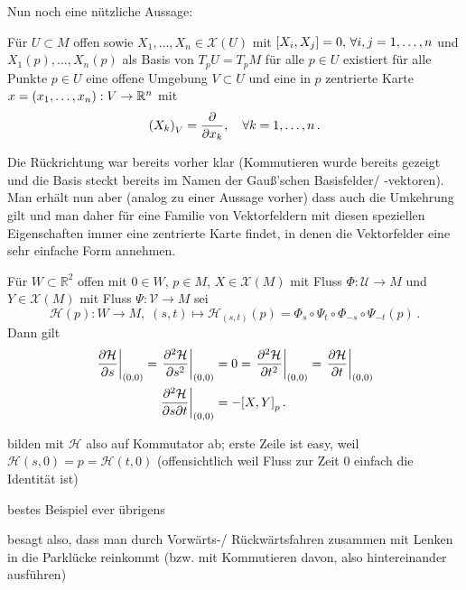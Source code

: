 \documentclass[../H_Analysis_main.tex]{subfiles}
\begin{document}
Nun noch eine nützliche Aussage:
\begin{cor}
Für $U \subset M$ offen sowie $X_1, \dots, X_n \in \mathcal{X}(U)$ mit $\qty[X_i, X_j] = 0, \, \forall i,j = 1, \dots, n$ und $X_1(p), \dots, X_n(p)$ als Basis von $T_p U = T_p M$ für alle $p \in U$ existiert für alle Punkte $p \in U$ eine offene Umgebung $V \subset U$ und eine in $p$ zentrierte Karte $x = \qty(x_1, \dots, x_n): V \rightarrow \mathbb{R}^n$ mit
\begin{equation}
\qty(X_k)_V = \pdv{x_k}, \quad \forall k = 1, \dots, n \, .
\end{equation}
\end{cor}
Die Rückrichtung war bereits vorher klar (Kommutieren wurde bereits gezeigt und die Basis steckt bereits im Namen der Gauß'schen Basisfelder/ -vektoren). Man erhält nun aber (analog zu einer Aussage vorher) dass auch die Umkehrung gilt und man daher für eine Familie von Vektorfeldern mit diesen speziellen Eigenschaften immer eine zentrierte Karte findet, in denen die Vektorfelder eine sehr einfache Form annehmen.

\begin{satz}
Für $W \subset \mathbb{R}^2$ offen mit $0 \in W$, $p \in M$, $X \in \mathcal{X}(M)$ mit Fluss $\Phi: \mathcal{U} \rightarrow M$ und $Y \in \mathcal{X}(M)$ mit Fluss $\Psi: \mathcal{V} \rightarrow M$ sei
\begin{equation}
\mathcal{H}(p): W \rightarrow M, \; (s, t) \mapsto \mathcal{H}_{(s, t)}(p) = \Phi_s \circ \Psi_t \circ \Phi_{- s} \circ \Psi_{- t}(p) \, .
\end{equation}
Dann gilt
\begin{equation}
\begin{split}
\eval{\pdv{\mathcal{H}}{s}}_{(0, 0)} = \eval{\pdv[2]{\mathcal{H}}{s}}_{(0, 0)} &= 0 = \eval{\pdv[2]{\mathcal{H}}{t}}_{(0, 0)} = \eval{\pdv{\mathcal{H}}{t}}_{(0, 0)}
\\
\eval{\pdv[2]{\mathcal{H}}{s}{t}}_{(0, 0)} &= - \qty[X, Y]_p \, .
\end{split}
\end{equation}
\end{satz}
bilden mit $\mathcal{H}$ also auf Kommutator ab; erste Zeile ist easy, weil $\mathcal{H}(s, 0) = p = \mathcal{H}(t, 0)$ (offensichtlich weil Fluss zur Zeit 0 einfach die Identität ist)


\begin{bsp}[Einparken]
bestes Beispiel ever übrigens

besagt also, dass man durch Vorwärts-/ Rückwärtsfahren zusammen mit Lenken in die Parklücke reinkommt (bzw. mit Kommutieren davon, also hintereinander ausführen)
\end{bsp}
\end{document}
